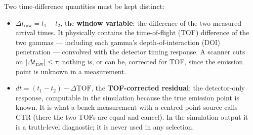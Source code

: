 \documentclass[11pt,a4paper]{article}
\begin{document}
Two time-difference quantities must be kept distinct:
\begin{itemize}
\item $\Delta t_{\mathrm{raw}} = t_1 - t_2$, the \textbf{window variable}: the difference of the
  two measured arrival times. It physically contains the time-of-flight (TOF) difference of the
  two gammas --- including each gamma's depth-of-interaction (DOI) penetration --- convolved
  with the detector timing response. A scanner cuts on
  $|\Delta t_{\mathrm{raw}}| \le \tau$; nothing is, or can be, corrected for TOF, since the
  emission point is unknown in a measurement.
\item $dt = (t_1 - t_2) - \Delta\mathrm{TOF}$, the \textbf{TOF-corrected residual}: the
  detector-only response, computable in the simulation because the true emission point is
  known. It is what a bench measurement with a centred point source calls CTR (there the two
  TOFs are equal and cancel). In the simulation output it is a truth-level diagnostic; it is
  never used in any selection.
\end{itemize}
\end{document}
